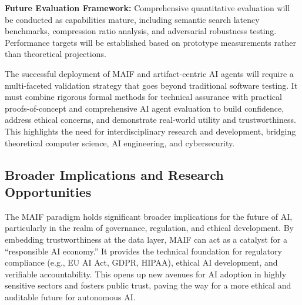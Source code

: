 \documentclass[conference]{IEEEtran}
\begin{document}
\textbf{Future Evaluation Framework:}
Comprehensive quantitative evaluation will be conducted as capabilities mature, including semantic search latency benchmarks, compression ratio analysis, and adversarial robustness testing. Performance targets will be established based on prototype measurements rather than theoretical projections.

The successful deployment of MAIF and artifact-centric AI agents will require a multi-faceted validation strategy that goes beyond traditional software testing. It must combine rigorous formal methods for technical assurance with practical proofs-of-concept and comprehensive AI agent evaluation to build confidence, address ethical concerns, and demonstrate real-world utility and trustworthiness. This highlights the need for interdisciplinary research and development, bridging theoretical computer science, AI engineering, and cybersecurity.

\subsection{Broader Implications and Research Opportunities}

The MAIF paradigm holds significant broader implications for the future of AI, particularly in the realm of governance, regulation, and ethical development. By embedding trustworthiness at the data layer, MAIF can act as a catalyst for a ``responsible AI economy.'' It provides the technical foundation for regulatory compliance (e.g., EU AI Act, GDPR, HIPAA), ethical AI development, and verifiable accountability\cite{ref5}. This opens up new avenues for AI adoption in highly sensitive sectors and fosters public trust, paving the way for a more ethical and auditable future for autonomous AI.
\end{document}
